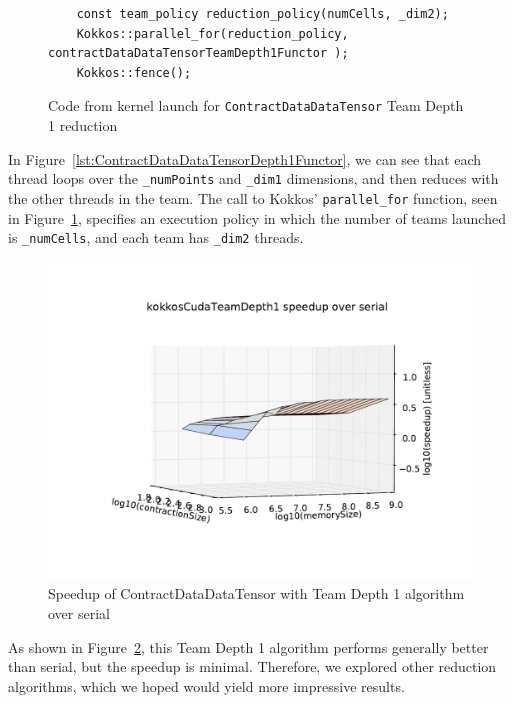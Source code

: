 \begin{figure}[ht]
    \begin{lstlisting}
    const team_policy reduction_policy(numCells, _dim2);
    Kokkos::parallel_for(reduction_policy, contractDataDataTensorTeamDepth1Functor );
    Kokkos::fence();
 \end{lstlisting}
\caption{Code from kernel launch for \texttt{ContractDataDataTensor} Team Depth
1 reduction
\label{lst:ContractDataDataTensorDepth1Call}} 
\end{figure}

In Figure~\ref{lst:ContractDataDataTensorDepth1Functor}, we can see that each
thread loops over the \texttt{\_numPoints} and \texttt{\_dim1} dimensions, and then
reduces with the other threads in the team.  The call to Kokkos'
\texttt{parallel\_for} function, seen in
Figure~\ref{lst:ContractDataDataTensorDepth1Call}, specifies an execution policy
in which the number of teams launched is \texttt{\_numCells}, and each team has
\texttt{\_dim2} threads.

\begin{figure}[ht]
    \includegraphics[scale=.55]{./VersusSerial_kokkosCudaTeamDepth1_clearCache_shadowfax.pdf}
\caption{Speedup of ContractDataDataTensor with Team Depth 1 algorithm over
    serial
\label{fig:ContractDataDataTensorDepth1}} 
\end{figure}

As shown in Figure~\ref{fig:ContractDataDataTensorDepth1}, this Team Depth 1
algorithm performs generally better than serial, but the speedup is minimal.
Therefore, we explored other reduction algorithms, which we hoped would yield
more impressive results.

